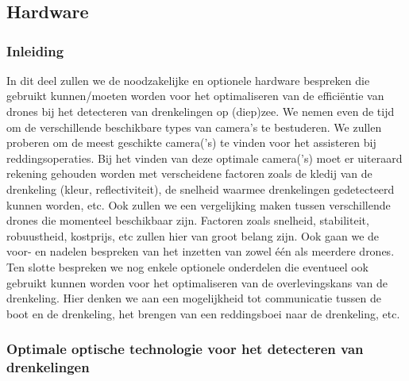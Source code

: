 \chapter{}
\label{ch:stand-van-zaken}



\section{Hardware}

\subsection{Inleiding}

In dit deel zullen we de noodzakelijke en optionele hardware bespreken die gebruikt kunnen/moeten worden voor het optimaliseren van de efficiëntie van drones bij het detecteren van drenkelingen op (diep)zee. We nemen even de tijd om de verschillende beschikbare types van camera's te bestuderen. We zullen proberen om de meest geschikte camera('s) te vinden voor het assisteren bij reddingsoperaties. Bij het vinden van deze optimale camera('s) moet er uiteraard rekening gehouden worden met verscheidene factoren zoals de kledij van de drenkeling (kleur, reflectiviteit), de snelheid waarmee drenkelingen gedetecteerd kunnen worden, etc. Ook zullen we een vergelijking maken tussen verschillende drones die momenteel beschikbaar zijn. Factoren zoals snelheid, stabiliteit, robuustheid, kostprijs, etc zullen hier van groot belang zijn. Ook gaan we de voor- en nadelen bespreken van het inzetten van zowel één als meerdere drones. Ten slotte bespreken we nog enkele optionele onderdelen die eventueel ook gebruikt kunnen worden voor het optimaliseren van de overlevingskans van de drenkeling. Hier denken we aan een mogelijkheid tot communicatie tussen de boot en de drenkeling, het brengen van een reddingsboei naar de drenkeling, etc.

\subsection{Optimale optische technologie voor het detecteren van drenkelingen}

